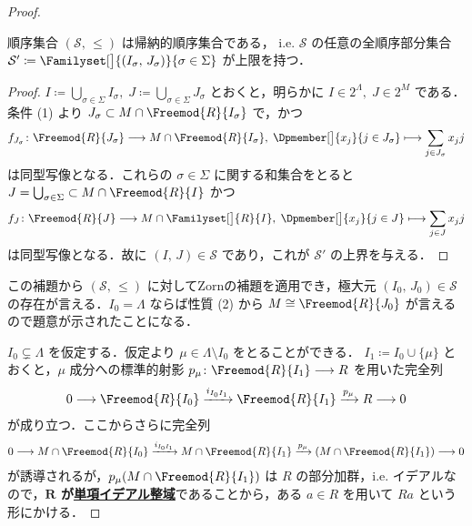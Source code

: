 \documentclass[algtopo_main]{subfiles}
\begin{document}
\begin{proof}
    \hrulefill
    \begin{mylem}[]{}
        順序集合 $(\mathcal{S},\, \le)$ は帰納的順序集合である，
        i.e. $\mathcal{S}$ の任意の全順序部分集合 $\mathcal{S}' \coloneqq \Familyset[\big]{(I_\sigma,\, J_\sigma)}{\sigma \in \Sigma}$ が上限を持つ．
    \end{mylem}
    \begin{proof}
        $I \coloneqq \bigcup_{\sigma \in \Sigma} I_\sigma,\; J \coloneqq \bigcup_{\sigma \in \Sigma} J_\sigma$ とおくと，明らかに $I \in 2^{\Lambda},\; J \in 2^M$ である．条件 (1) より $J_\sigma \subset M \cap \Freemod{R}{I_\sigma}$ で，かつ
        \begin{align}
            f_{J_\sigma} \colon \Freemod{R}{J_\sigma} \lto M \cap \Freemod{R}{I_\sigma},\; \Dpmember[\big]{x_j}{j \in J_\sigma} \lmto \sum_{j \in J_\sigma} x_j j
        \end{align}
        は同型写像となる．これらの $\sigma \in \Sigma$ に関する和集合をとると
        $J = \bigcup_{\sigma \in \Sigma} \subset M \cap \Freemod{R}{I}$ かつ
        \begin{align}
            f_J \colon \Freemod{R}{J} \lto M \cap \Familyset[\big]{R}{I},\; \Dpmember[\big]{x_j}{j \in J} \lmto \sum_{j \in J} x_j j
        \end{align}
        は同型写像となる．故に $(I,\, J) \in \mathcal{S}$ であり，これが $\mathcal{S}'$ の上界を与える．
    \end{proof}

    \hrulefill

    この補題から $(\mathcal{S},\, \le)$ に対してZornの補題を適用でき，極大元 $(I_0,\, J_0) \in \mathcal{S}$ の存在が言える．$I_0 = \Lambda$ ならば性質 (2) から $M \cong \Freemod{R}{J_0}$ が言えるので題意が示されたことになる．

    $I_0 \subsetneq \Lambda$ を仮定する．仮定より $\mu \in \Lambda \setminus I_0$ をとることができる．
    $I_1 \coloneqq I_0 \cup \{\mu\}$ とおくと，$\mu$ 成分への標準的射影 $p_\mu \colon \Freemod{R}{I_1} \lto R$ を用いた完全列
    \begin{align}
        0 \lto \Freemod{R}{I_0} \xrightarrow{i_{I_0 I_1}} \Freemod{R}{I_1} \xrightarrow{p_\mu} R \lto 0
    \end{align}
    が成り立つ．ここからさらに完全列
    \begin{align}
        \label{SES:PID}
        0 \lto M \cap \Freemod{R}{I_0} \xrightarrow{i_{I_0 I_1}} M \cap \Freemod{R}{I_1} \xrightarrow{p_\mu}(M \cap \Freemod{R}{I_1}) \lto 0
    \end{align}
    が誘導されるが，$p_\mu (M \cap \Freemod{R}{I_1})$ は $R$ の部分加群，i.e. イデアルなので，\textbf{$\bm{R}$ が\hyperref[def:PID]{単項イデアル整域}}であることから，ある $a \in R$ を用いて $Ra$ という形にかける．


\end{proof}
\end{document}
